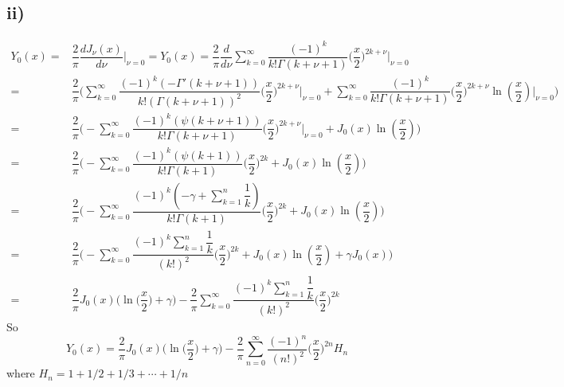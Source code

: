 \documentclass[a4paper,12pt,titlepage]{article}
\begin{document}
\subsection*{ii)}
\begin{align*}
Y_0(x)=&\dfrac{2}{\pi}\dfrac{dJ_{\nu}(x)}{d\nu}\Big|_{\nu=0}=Y_0(x)=\dfrac{2}{\pi}\dfrac{d}{d\nu}\sum\limits_{k=0}^{\infty}\dfrac{(-1)^k}{k!\Gamma(k+\nu+1)}\Big(\dfrac{x}{2}\Big)^{2k+\nu}\Big|_{\nu=0}\\
=&\dfrac{2}{\pi}\Big(\sum\limits_{k=0}^{\infty}\dfrac{(-1)^k(-\Gamma'(k+\nu+1))}{k!(\Gamma(k+\nu+1))^2}\Big(\dfrac{x}{2}\Big)^{2k+\nu}\Big|_{\nu=0}+\sum\limits_{k=0}^{\infty}\dfrac{(-1)^k}{k!\Gamma(k+\nu+1)}\Big(\dfrac{x}{2}\Big)^{2k+\nu}\ln(\dfrac{x}{2})\Big|_{\nu=0}\Big)\\
=&\dfrac{2}{\pi}\Big(-\sum\limits_{k=0}^{\infty}\dfrac{(-1)^k(\psi(k+\nu+1))}{k!\Gamma(k+\nu+1)}\Big(\dfrac{x}{2}\Big)^{2k+\nu}\Big|_{\nu=0}+J_0(x)\ln(\dfrac{x}{2})\Big)\\
=&\dfrac{2}{\pi}\Big(-\sum\limits_{k=0}^{\infty}\dfrac{(-1)^k(\psi(k+1))}{k!\Gamma(k+1)}\Big(\dfrac{x}{2}\Big)^{2k}+J_0(x)\ln(\dfrac{x}{2})\Big)\\
=&\dfrac{2}{\pi}\Big(-\sum\limits_{k=0}^{\infty}\dfrac{(-1)^k(-\gamma+\sum\limits_{k=1}^n\dfrac{1}{k})}{k!\Gamma(k+1)}\Big(\dfrac{x}{2}\Big)^{2k}+J_0(x)\ln(\dfrac{x}{2})\Big)\\
=&\dfrac{2}{\pi}\Big(-\sum\limits_{k=0}^{\infty}\dfrac{(-1)^k\sum\limits_{k=1}^n\dfrac{1}{k}}{(k!)^2}\Big(\dfrac{x}{2}\Big)^{2k}+J_0(x)\ln(\dfrac{x}{2})+\gamma J_0(x)\Big)\\
=&\dfrac{2}{\pi}J_0(x)\Big(\ln\Big(\dfrac{x}{2}\Big)+\gamma\Big)-\dfrac{2}{\pi}\sum\limits_{k=0}^{\infty}\dfrac{(-1)^k\sum\limits_{k=1}^n\dfrac{1}{k}}{(k!)^2}\Big(\dfrac{x}{2}\Big)^{2k}
\end{align*}
So
$$Y_0(x)=\dfrac{2}{\pi}J_0(x)\Big(\ln\Big(\dfrac{x}{2}\Big)+\gamma\Big)-\dfrac{2}{\pi}\sum\limits_{n=0}^{\infty}\dfrac{(-1)^n}{(n!)^2}\Big(\dfrac{x}{2}\Big)^{2n}H_n$$
where $H_n=1+1/2+1/3+\cdots+1/n$
\end{document}
